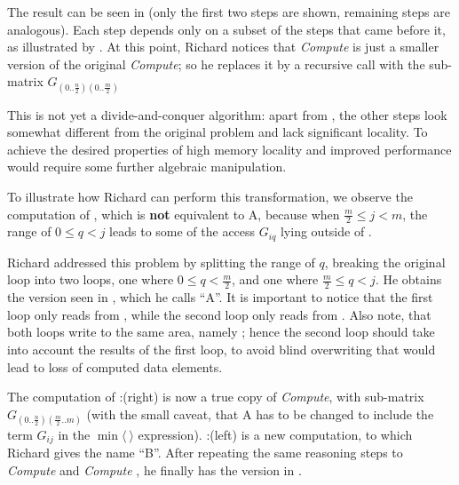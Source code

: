 The result can be seen in  (only the first two steps are shown, remaining steps are analogous).
Each step depends only on a subset of the steps that came before it, 
as illustrated by . 
At this point, Richard notices that {\it Compute } is just a smaller version of
the original {\it Compute}; so he replaces it by a recursive call with
the sub-matrix $G_{(0..\frac{n}{2})(0..\frac{m}{2})}$

This is not yet a divide-and-conquer algorithm: 
apart from , the other steps
look somewhat different from the original problem and lack significant locality. 
To achieve the desired properties of high memory locality and improved
performance would require some further algebraic manipulation.

To illustrate how Richard can perform this transformation, 
we observe the computation of , which is {\bf not} equivalent to
A, 
because when $\frac{m}{2} \leq j < m$, the range of $0\leq q < j$ leads to
some of the access $G_{iq}$ lying outside of .

Richard addressed this problem by splitting the range of $q$, breaking
the original loop into two loops, one where $0\leq q < \frac{m}{2}$,
and one where $\frac{m}{2}\leq q < j$. He obtains the version seen in
, which he calls ``A''. 
It is important to notice that the first
loop only reads from , while the second loop only reads from .
Also note, that both loops write to the same area, namely ; hence
the second loop should take into account the results of the first loop,
to avoid blind overwriting that would lead to loss of computed data elements.

The computation of :(right) is now a true copy of {\it Compute},
with sub-matrix $G_{(0..\frac{n}{2})(\frac{m}{2}..m)}$ (with the small caveat,
that A has to be changed to include the term $G_{ij}$ in the $\min\langle~\rangle$ expression).
:(left) is a new computation, to which Richard gives the name ``B''. After repeating
the same reasoning steps to {\it Compute } and {\it Compute },
he finally has the version in .

